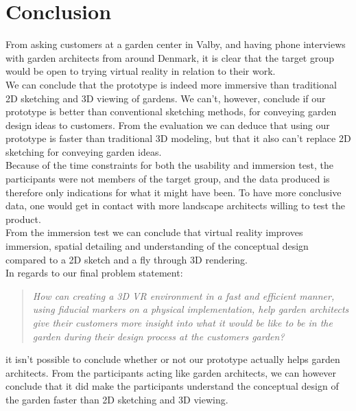 \chapter{Conclusion}
From asking customers at a garden center in Valby, and having phone interviews with garden architects from around Denmark, it is clear that the target group would be open to trying virtual reality in relation to their work. \\

We can conclude that the prototype is indeed more immersive than traditional 2D sketching and 3D viewing of gardens. We can't, however, conclude if our prototype is better than conventional sketching methods, for conveying garden design ideas to customers. From the evaluation we can deduce that using our prototype is faster than traditional 3D modeling, but that it also can't replace 2D sketching for conveying garden ideas.\\

Because of the time constraints for both the usability and immersion test, the participants were not members of the target group, and the data produced is therefore only indications for what it might have been. To have more conclusive data, one would get in contact with more landscape architects willing to test the product.\\

From the immersion test we can conclude that virtual reality improves immersion, spatial detailing and understanding of the conceptual design compared to a 2D sketch and a fly through 3D rendering.\\

In regards to our final problem statement:\\
\begin{quote}
	\textit{How can creating a 3D VR environment in a fast and efficient manner, using fiducial markers on a physical implementation, help garden architects give their customers more insight into what it would be like to be in the garden during their design process at the customers garden?}\\
\end{quote}
it isn't possible to conclude whether or not our prototype actually helps garden architects. From the participants acting like garden architects, we can however conclude that it did make the participants understand the conceptual design of the garden faster than 2D sketching and 3D viewing.\\


